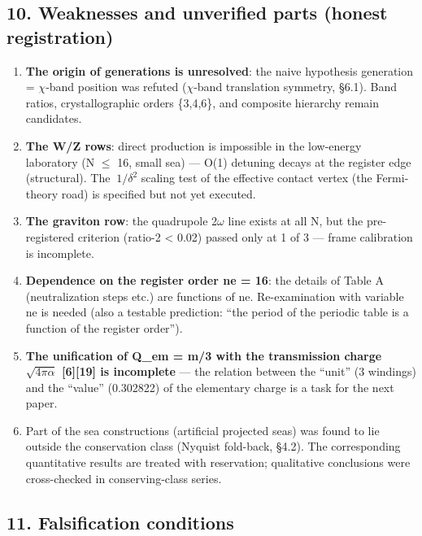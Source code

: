 \documentclass[
]{article}
\providecommand{\tightlist}{%
  \setlength{\itemsep}{0pt}\setlength{\parskip}{0pt}}
\begin{document}
\subsection{10. Weaknesses and unverified parts (honest
registration)}\label{weaknesses-and-unverified-parts-honest-registration}

\begin{enumerate}
\def\labelenumi{\arabic{enumi}.}
\tightlist
\item
  \textbf{The origin of generations is unresolved}: the naive hypothesis
  generation = \(\chi\)-band position was refuted (\(\chi\)-band
  translation symmetry, §6.1). Band ratios, crystallographic orders
  \{3,4,6\}, and composite hierarchy remain candidates.
\item
  \textbf{The W/Z rows}: direct production is impossible in the
  low-energy laboratory (N \(\le\) 16, small sea) --- O(1) detuning
  decays at the register edge (structural). The \(~1/\delta^2\) scaling
  test of the effective contact vertex (the Fermi-theory road) is
  specified but not yet executed.
\item
  \textbf{The graviton row}: the quadrupole 2\(\omega\) line exists at
  all N, but the pre-registered criterion (\textbar ratio-2\textbar{}
  \textless{} 0.02) passed only at 1 of 3 --- frame calibration is
  incomplete.
\item
  \textbf{Dependence on the register order ne = 16}: the details of
  Table A (neutralization steps etc.) are functions of ne.
  Re-examination with variable ne is needed (also a testable prediction:
  ``the period of the periodic table is a function of the register
  order'').
\item
  \textbf{The unification of Q\_em = m/3 with the transmission charge
  \(\sqrt{4\pi\alpha}\) {[}6{]}{[}19{]} is incomplete} --- the relation
  between the ``unit'' (3 windings) and the ``value'' (0.302822) of the
  elementary charge is a task for the next paper.
\item
  Part of the sea constructions (artificial projected seas) was found to
  lie outside the conservation class (Nyquist fold-back, §4.2). The
  corresponding quantitative results are treated with reservation;
  qualitative conclusions were cross-checked in conserving-class series.
\end{enumerate}

\subsection{11. Falsification
conditions}\label{falsification-conditions}
\end{document}
